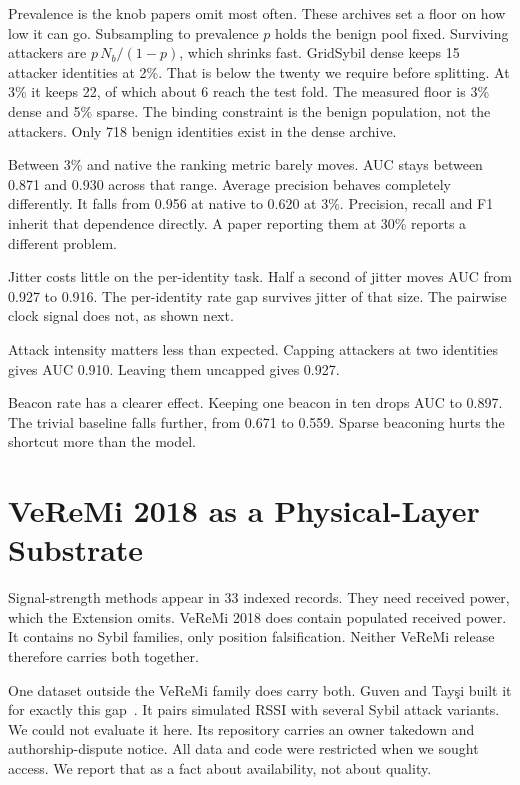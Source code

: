\documentclass[journal,twoside]{IEEEtran}
\begin{document}
Prevalence is the knob papers omit most often.
These archives set a floor on how low it can go.
Subsampling to prevalence $p$ holds the benign pool fixed.
Surviving attackers are $p\,N_{b}/(1-p)$, which shrinks fast.
GridSybil dense keeps 15 attacker identities at 2\%.
That is below the twenty we require before splitting.
At 3\% it keeps 22, of which about 6 reach the test fold.
The measured floor is 3\% dense and 5\% sparse.
The binding constraint is the benign population, not the attackers.
Only 718 benign identities exist in the dense archive.

Between 3\% and native the ranking metric barely moves.
AUC stays between 0.871 and 0.930 across that range.
Average precision behaves completely differently.
It falls from 0.956 at native to 0.620 at 3\%.
Precision, recall and F1 inherit that dependence directly.
A paper reporting them at 30\% reports a different problem.

Jitter costs little on the per-identity task.
Half a second of jitter moves AUC from 0.927 to 0.916.
The per-identity rate gap survives jitter of that size.
The pairwise clock signal does not, as shown next.

Attack intensity matters less than expected.
Capping attackers at two identities gives AUC 0.910.
Leaving them uncapped gives 0.927.

Beacon rate has a clearer effect.
Keeping one beacon in ten drops AUC to 0.897.
The trivial baseline falls further, from 0.671 to 0.559.
Sparse beaconing hurts the shortcut more than the model.

\section{VeReMi 2018 as a Physical-Layer Substrate}

Signal-strength methods appear in 33 indexed records.
They need received power, which the Extension omits.
VeReMi 2018 does contain populated received power.
It contains no Sybil families, only position falsification.
Neither VeReMi release therefore carries both together.

One dataset outside the VeReMi family does carry both.
Guven and Tay\c{s}i built it for exactly this gap~\cite{guven2024}.
It pairs simulated RSSI with several Sybil attack variants.
We could not evaluate it here.
Its repository carries an owner takedown and authorship-dispute notice.
All data and code were restricted when we sought access.
We report that as a fact about availability, not about quality.
\end{document}
